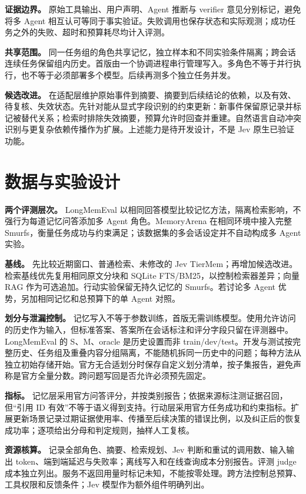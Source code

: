 \documentclass[UTF8,a4paper,zihao=5]{ctexart}
\begin{document}
\textbf{证据边界。} 原始工具输出、用户声明、Agent 推断与 verifier 意见分别标记，避免将多 Agent 相互认可等同于事实验证。失败调用也保存状态和实际观测；成功任务之外的失败、超时和预算耗尽均计入评测。

\textbf{共享范围。} 同一任务组的角色共享记忆，独立样本和不同实验条件隔离；跨会话连续任务保留组内历史。首版由一个协调进程串行管理写入。多角色不等于并行执行，也不等于必须部署多个模型。后续再测多个独立任务并发。

\textbf{候选改进。} 在适配层维护原始事件到摘要、摘要到后续结论的依赖，以及有效、待复核、失效状态。先针对能从显式字段识别的约束更新：新事件保留原记录并标记被替代关系；检索时排除失效摘要，预算允许时回查并重建。自然语言自动冲突识别与更复杂依赖传播作为扩展。上述能力是待开发设计，不是 Jev 原生已验证功能。

\section{数据与实验设计}
\textbf{两个评测层次。} LongMemEval 以相同回答模型比较记忆方法，隔离检索影响，不强行为每道记忆问答添加多 Agent 角色。MemoryArena 在相同环境中接入完整 Smurfs，衡量任务成功与约束满足；该数据集的多会话设定并不自动构成多 Agent 实验。

\textbf{基线。} 先比较近期窗口、普通检索、未修改的 Jev TierMem；再增加候选改进。检索基线优先复用相同原文分块和 SQLite FTS/BM25，以控制检索器差异；向量 RAG 作为可选追加。行动实验保留无持久记忆的 Smurfs。若讨论多 Agent 优势，另加相同记忆和总预算下的单 Agent 对照。

\textbf{划分与泄漏控制。} 记忆写入不等于参数训练，首版无需训练模型。使用允许访问的历史作为输入，但标准答案、答案所在会话标注和评分字段只留在评测器中。LongMemEval 的 S、M、oracle 是历史设置而非 train/dev/test。开发与测试按完整历史、任务组及重叠内容分组隔离，不能随机拆同一历史中的问题；每种方法从独立初始存储开始。官方无合适划分时保存自定义划分清单，按子集报告，避免声称是官方全量分数。跨问题写回是否允许必须预先固定。

\textbf{指标。} 记忆层采用官方问答评分，并按类别报告；依据来源标注测证据召回，但“引用 ID 有效”不等于语义得到支持。行动层采用官方任务成功和约束指标。扩展更新场景记录过期证据使用率、传播至后续决策的错误比例，以及纠正后的恢复成功率；逐项给出分母和判定规则，抽样人工复核。

\textbf{资源核算。} 记录全部角色、摘要、检索规划、Jev 判断和重试的调用数、输入输出 token、端到端延迟与失败率；离线写入和在线查询成本分别报告。评测 judge 成本独立列出。服务不返回用量时标记未知，不能按零处理。跨方法控制总预算、工具权限和反馈条件；Jev 模型作为额外组件明确列出。
\end{document}
